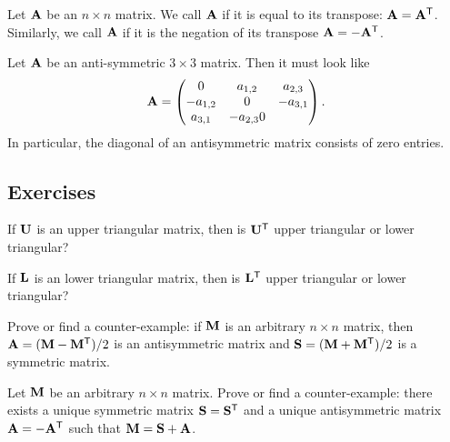 \begin{definition}
Let $\mathbf{A}$ be an $n\times n$ matrix. We call $\mathbf{A}$
 if it is equal to its transpose: $\mathbf{A}=\mathbf{A}^{\mathsf{T}}$.
Similarly, we call $\mathbf{A}$  if it is the
negation of its transpose $\mathbf{A}=-\mathbf{A}^{\mathsf{T}}$.
\end{definition}

\begin{example}
Let $\mathbf{A}$ be an anti-symmetric $3\times 3$ matrix. Then it must look
like
\begin{equation}
\mathbf{A} = \begin{pmatrix}0 & a_{1,2} & a_{2,3} \\
-a_{1,2} & 0 & -a_{3,1}\\
a_{3,1} & - a_{2,3} 0
\end{pmatrix}.
\end{equation}
In particular, the diagonal of an antisymmetric matrix consists of zero entries.
\end{example}

\subsection*{Exercises}

\begin{exercise}
If $\mathbf{U}$ is an upper triangular matrix, then is
$\mathbf{U}^{\mathsf{T}}$ upper triangular or lower triangular?
\end{exercise}

\begin{exercise}
If $\mathbf{L}$ is an lower triangular matrix, then is
$\mathbf{L}^{\mathsf{T}}$ upper triangular or lower triangular?
\end{exercise}

\begin{exercise}
Prove or find a counter-example: if $\mathbf{M}$ is an arbitrary $n\times n$
matrix, then $\mathbf{A} = (\mathbf{M} - \mathbf{M}^{\mathsf{T}})/2$ is an
antisymmetric matrix and
$\mathbf{S} = (\mathbf{M} + \mathbf{M}^{\mathsf{T}})/2$ is a symmetric matrix.
\end{exercise}

\begin{exercise}
Let $\mathbf{M}$ be an arbitrary $n\times n$ matrix.
Prove or find a counter-example: there exists a unique symmetric 
matrix $\mathbf{S}=\mathbf{S}^{\mathsf{T}}$ and a unique antisymmetric matrix
$\mathbf{A}=-\mathbf{A}^{\mathsf{T}}$ such that $\mathbf{M}=\mathbf{S}+\mathbf{A}$. 
\end{exercise}


